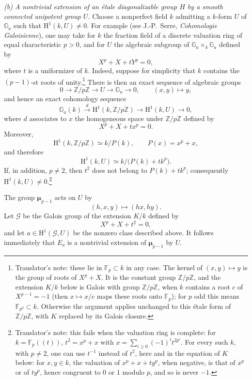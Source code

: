 \smallskip
\noindent
\emph{(b) A nontrivial extension of an étale diagonalizable group
\(H\) by a smooth connected unipotent group \(U\).}
Choose a nonperfect field \(k\) admitting a \(k\)-form \(U\) of
\(\mathbb G_a\) such that \(\mathrm H^1(k,U)\ne0\).  For example
(see J.-P.\ Serre, \emph{Cohomologie Galoisienne}), one may take
for \(k\) the fraction field of a discrete valuation ring of
equal characteristic \(p>0\), and for \(U\) the algebraic
subgroup of \(\mathbb G_a\times_k\mathbb G_a\) defined by
\[
  X^p+X+tY^p=0,
\]
where \(t\) is a uniformizer of \(k\).  Indeed, suppose for
simplicity that \(k\) contains the \((p-1)\)-st roots of unity.\footnote{Translator's note: these
lie in \(\mathbb F_p\subset k\) in any case. The kernel of \((x,y)\mapsto y\) is the group
of roots of \(X^p+X\). It is the constant group \(\mathbb Z/p\mathbb Z\), and the extension
\(K/k\) below is Galois with group \(\mathbb Z/p\mathbb Z\), when \(k\) contains a root \(c\)
of \(X^{p-1}=-1\) (then \(x\mapsto x/c\) maps these roots onto \(\mathbb F_p\)); for \(p\)
odd this means \(\mathbb F_{p^2}\subset k\). Otherwise the argument applies unchanged to
this étale form of \(\mathbb Z/p\mathbb Z\), with \(K\) replaced by its Galois closure.}
There is then an exact sequence of algebraic groups
\[
  0\longrightarrow\mathbb Z/p\mathbb Z
   \longrightarrow U
   \longrightarrow\mathbb G_a
   \longrightarrow0,
  \qquad
  (x,y)\longmapsto y,
\]
and hence an exact cohomology sequence
\[
  \mathbb G_a(k)\xrightarrow{\,d\,}
  \mathrm H^1(k,\mathbb Z/p\mathbb Z)
  \longrightarrow\mathrm H^1(k,U)
  \longrightarrow0,
\]
where \(d\) associates to \(x\) the homogeneous space under
\(\mathbb Z/p\mathbb Z\) defined by
\[
  X^p+X+tx^p=0.
\]
Moreover,
\[
  \mathrm H^1(k,\mathbb Z/p\mathbb Z)\simeq k/P(k),
  \qquad P(x)=x^p+x,
\]
and therefore
\[
  \mathrm H^1(k,U)\simeq k/\bigl(P(k)+tk^p\bigr).
\]
If, in addition, \(p\ne2\), then \(t^2\) does not belong to
\(P(k)+tk^p\); consequently \(\mathrm H^1(k,U)\ne0\).\footnote{Translator's note: this fails when the
valuation ring is complete: for \(k=\mathbb F_p((t))\), \(t^2=x^p+x\) with
\(x=\sum_{i\geq0}(-1)^it^{2p^i}\). For every such \(k\), with \(p\ne2\), one can use
\(t^{-1}\) instead of \(t^2\), here and in the equation of \(K\) below: for \(x,y\in k\), the
valuation of \(x^p+x+ty^p\), when negative, is that of \(x^p\) or of \(ty^p\), hence
congruent to \(0\) or \(1\) modulo \(p\), and so is never \(-1\).}

The group \(\boldsymbol\mu_{p-1}\) acts on \(U\) by
\[
  (h,x,y)\longmapsto(hx,hy).
\]
Let \(\mathscr G\) be the Galois group of the extension \(K/k\)
defined by
\[
  X^p+X+t^2=0,
\]
and let \(a\in\mathrm H^1(\mathscr G,U)\) be the nonzero class
described above.  It follows immediately that \(E_a\) is a
nontrivial extension of \(\boldsymbol\mu_{p-1}\) by \(U\).

